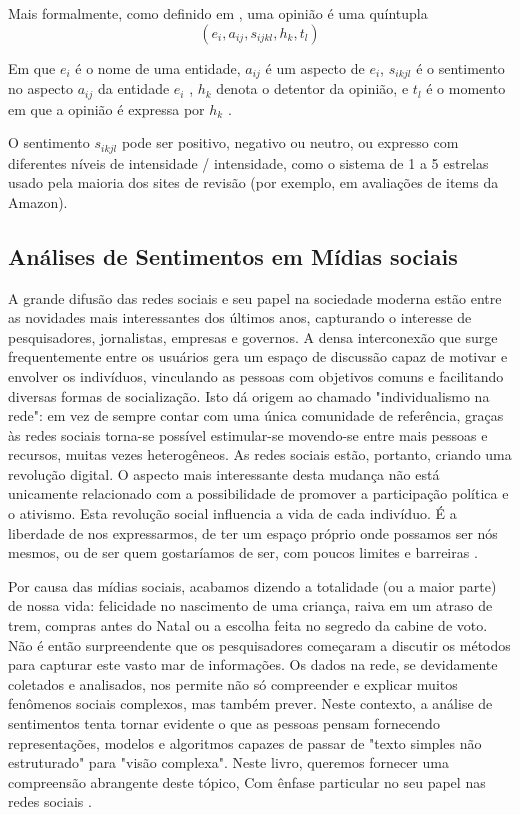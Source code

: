 \documentclass[
	12pt,				%
	openright,			%
	oneside,			%
	a4paper,			%
	english,			%
	spanish,			%
	brazil				%
	]{abntex2}
\begin{document}
Mais formalmente, como definido em \cite{bliu_2012}, uma opinião é uma quíntupla \[ \left ( e_{i}, a_{ij}, s_{ijkl},h_{k},t_{l} \right ) \]


Em que $e_{i}$ é o nome de uma entidade, $a_{ij}$ é um aspecto de $e_{i}$, $s_{ikjl}$ é o sentimento no aspecto $a_{ij}$  da entidade $e_{i}$ , $h_{k}$ denota o detentor da opinião, e $t_{l}$  é o momento em que a opinião é expressa por $h_{k}$ .

O sentimento $s_{ikjl}$ pode ser positivo, negativo ou neutro, ou expresso com diferentes níveis de intensidade / intensidade, como o sistema de 1 a 5 estrelas usado pela maioria dos sites de revisão (por exemplo, em avaliações de items da Amazon).

	\subsection*{Análises de Sentimentos em Mídias sociais}
	
A grande difusão das redes sociais e seu papel na sociedade moderna estão entre as novidades mais interessantes dos últimos anos, capturando o interesse de pesquisadores, jornalistas, empresas e governos. A densa interconexão que surge frequentemente entre os usuários gera um espaço de discussão capaz de motivar e envolver os indivíduos, vinculando as pessoas com objetivos comuns e facilitando diversas formas de socialização. Isto dá origem ao chamado "individualismo na rede": em vez de sempre contar com uma única comunidade de referência, graças às redes sociais torna-se possível estimular-se movendo-se entre mais pessoas e recursos, muitas vezes heterogêneos. As redes sociais estão, portanto, criando uma revolução digital. O aspecto mais interessante desta mudança não está unicamente relacionado com a possibilidade de promover a participação política e o ativismo. Esta revolução social influencia a vida de cada indivíduo. É a liberdade de nos expressarmos, de ter um espaço próprio onde possamos ser nós mesmos, ou de ser quem gostaríamos de ser, com poucos limites e barreiras \cite{book_sentiment_social}.

Por causa das mídias sociais, acabamos dizendo a totalidade (ou a maior parte) de nossa vida: felicidade no nascimento de uma criança, raiva em um atraso de trem, compras antes do Natal ou a escolha feita no segredo da cabine de voto. Não é então surpreendente que os pesquisadores começaram a discutir os métodos para capturar este vasto mar de informações. Os dados na rede, se devidamente coletados e analisados, nos permite não só compreender e explicar muitos fenômenos sociais complexos, mas também prever. Neste contexto, a análise de sentimentos tenta tornar evidente o que as pessoas pensam fornecendo representações, modelos e algoritmos capazes de passar de "texto simples não estruturado" para "visão complexa". Neste livro, queremos fornecer uma compreensão abrangente deste tópico, Com ênfase particular no seu papel nas redes sociais \cite{book_sentiment_social}.
\end{document}
